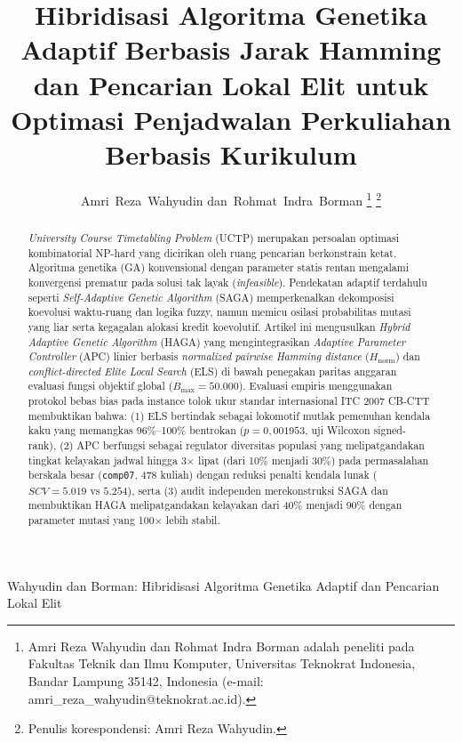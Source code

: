 \documentclass[journal]{IEEEtran}
\begin{document}
\title{Hibridisasi Algoritma Genetika Adaptif Berbasis Jarak Hamming dan Pencarian Lokal Elit untuk Optimasi Penjadwalan Perkuliahan Berbasis Kurikulum}

\author{Amri~Reza~Wahyudin
        dan~Rohmat~Indra~Borman%
\thanks{Amri Reza Wahyudin dan Rohmat Indra Borman adalah peneliti pada Fakultas Teknik dan Ilmu Komputer, Universitas Teknokrat Indonesia, Bandar Lampung 35142, Indonesia (e-mail: amri\_reza\_wahyudin@teknokrat.ac.id).}%
\thanks{Penulis korespondensi: Amri Reza Wahyudin.}%
}

%
{Wahyudin dan Borman: Hibridisasi Algoritma Genetika Adaptif dan Pencarian Lokal Elit}

\maketitle

\begin{abstract}
\textit{University Course Timetabling Problem} (UCTP) merupakan persoalan optimasi kombinatorial NP-hard yang dicirikan oleh ruang pencarian berkonstrain ketat. Algoritma genetika (GA) konvensional dengan parameter statis rentan mengalami konvergensi prematur pada solusi tak layak (\textit{infeasible}). Pendekatan adaptif terdahulu seperti \textit{Self-Adaptive Genetic Algorithm} (SAGA) memperkenalkan dekomposisi koevolusi waktu-ruang dan logika fuzzy, namun memicu osilasi probabilitas mutasi yang liar serta kegagalan alokasi kredit koevolutif. Artikel ini mengusulkan \textit{Hybrid Adaptive Genetic Algorithm} (HAGA) yang mengintegrasikan \textit{Adaptive Parameter Controller} (APC) linier berbasis \textit{normalized pairwise Hamming distance} ($H_{\text{norm}}$) dan \textit{conflict-directed Elite Local Search} (ELS) di bawah penegakan paritas anggaran evaluasi fungsi objektif global ($B_{\max} = 50.000$). Evaluasi empiris menggunakan protokol bebas bias pada instance tolok ukur standar internasional ITC 2007 CB-CTT membuktikan bahwa: (1) ELS bertindak sebagai lokomotif mutlak pemenuhan kendala kaku yang memangkas 96\%--100\% bentrokan ($p = 0{,}001953$, uji Wilcoxon signed-rank), (2) APC berfungsi sebagai regulator diversitas populasi yang melipatgandakan tingkat kelayakan jadwal hingga 3$\times$ lipat (dari 10\% menjadi 30\%) pada permasalahan berskala besar (\texttt{comp07}, 478 kuliah) dengan reduksi penalti kendala lunak ($SCV = 5.019$ vs $5.254$), serta (3) audit independen merekonstruksi SAGA dan membuktikan HAGA melipatgandakan kelayakan dari 40\% menjadi 90\% dengan parameter mutasi yang 100$\times$ lebih stabil.
\end{abstract}
\end{document}
